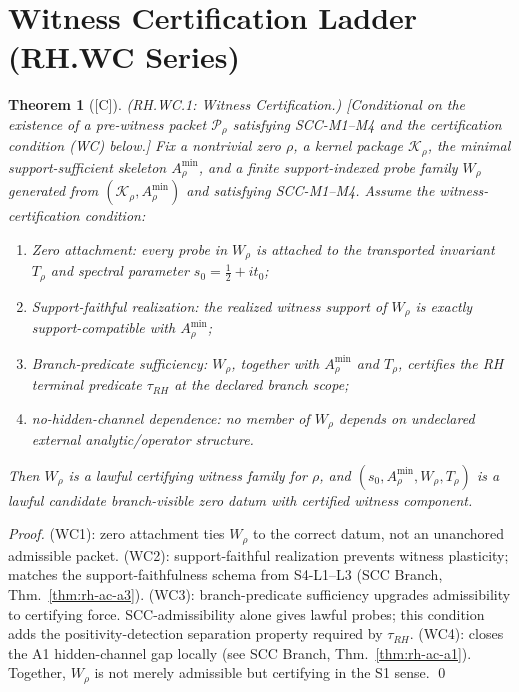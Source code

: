 \documentclass[12pt,oneside]{amsbook}
\theoremstyle{plain}
\newtheorem{theorem}{Theorem}[section]
\theoremstyle{definition}
\theoremstyle{remark}
\newcommand{\status}[1]{\textup{[#1]}}
\begin{document}
\section{Witness Certification Ladder (RH.WC Series)}
\label{sec:rh-wc}

\begin{theorem}[\status{C}]\label{thm:rh-wc1}
\textup{(RH.WC.1: Witness Certification.)}
\textup{[Conditional on the existence of a pre-witness packet
$\mathcal{P}_\rho$ satisfying SCC-M1--M4 and the certification
condition (WC) below.]}
Fix a nontrivial zero $\rho$, a kernel package $\mathcal{K}_\rho$,
the minimal support-sufficient skeleton $A_\rho^{\min}$, and a
finite support-indexed probe family $W_\rho$ generated from
$(\mathcal{K}_\rho, A_\rho^{\min})$ and satisfying SCC-M1--M4.
Assume the \emph{witness-certification condition}:
\begin{enumerate}[label=\textup{(WC\arabic*)}]
 \item \emph{Zero attachment}: every probe in $W_\rho$ is attached
 to the transported invariant $T_\rho$ and spectral parameter
 $s_0 = \tfrac{1}{2}+it_0$;
 \item \emph{Support-faithful realization}: the realized witness
 support of $W_\rho$ is exactly support-compatible with
 $A_\rho^{\min}$;
 \item \emph{Branch-predicate sufficiency}: $W_\rho$, together
 with $A_\rho^{\min}$ and $T_\rho$, certifies the RH terminal
 predicate $\tau_{RH}$ at the declared branch scope;
 \item \emph{no-hidden-channel dependence}: no member of $W_\rho$
 depends on undeclared external analytic/operator structure.
\end{enumerate}
Then $W_\rho$ is a lawful certifying witness family for $\rho$, and
$(s_0, A_\rho^{\min}, W_\rho, T_\rho)$ is a lawful candidate
branch-visible zero datum with certified witness component.
\end{theorem}

\begin{proof}
(WC1): zero attachment ties $W_\rho$ to the correct datum, not an
unanchored admissible packet.
(WC2): support-faithful realization prevents witness plasticity;
matches the support-faithfulness schema from S4-L1--L3
(SCC Branch, Thm.~\ref{thm:rh-ac-a3}).
(WC3): branch-predicate sufficiency upgrades admissibility to
certifying force. SCC-admissibility alone gives lawful probes;
this condition adds the positivity-detection separation property
required by $\tau_{RH}$.
(WC4): closes the A1 hidden-channel gap locally (see
SCC Branch, Thm.~\ref{thm:rh-ac-a1}).
Together, $W_\rho$ is not merely admissible but certifying in the
S1 sense. \qed
\end{proof}
\end{document}
